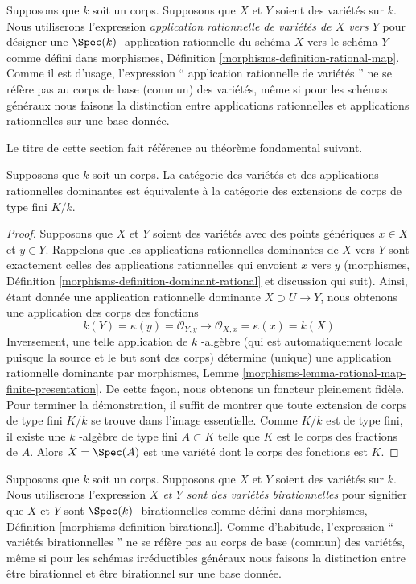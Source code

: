 \noindent
Supposons que $k$ soit un corps. Supposons que $X$ et $Y$ soient des variétés
sur $k$. Nous utiliserons l'expression {\it application rationnelle de
variétés de $X$ vers $Y$ } pour désigner une $\Spec(k)$ -application
rationnelle du schéma $X$ vers le schéma $Y$ comme défini dans morphismes,
Définition \ref{morphisms-definition-rational-map}. Comme il est d'usage,
l'expression `` application rationnelle de variétés '' ne se réfère pas au corps de
base (commun) des variétés, même si pour les schémas généraux nous faisons la
distinction entre applications rationnelles et applications rationnelles sur une base donnée.

\medskip\noindent
Le titre de cette section fait référence au théorème fondamental suivant.

\begin{theorem}
\label{theorem-varieties-rational-maps}
Supposons que $k$ soit un corps. La catégorie des variétés
et des applications rationnelles dominantes est équivalente
à la catégorie des extensions de corps de type fini $K/k$.
\end{theorem}

\begin{proof}
Supposons que $X$ et $Y$ soient des variétés avec des points
génériques $x \in X$ et $y \in Y$. Rappelons que les applications
rationnelles dominantes de $X$ vers $Y$ sont exactement celles des
applications rationnelles qui envoient $x$ vers $y$ (morphismes,
Définition \ref{morphisms-definition-dominant-rational} et discussion
qui suit). Ainsi, étant donnée une application rationnelle dominante $X
\supset U \to Y$, nous obtenons une application des corps des fonctions
$$
k(Y) = \kappa(y) = \mathcal{O}_{Y, y}
\longrightarrow
\mathcal{O}_{X, x} = \kappa(x) = k(X)
$$
Inversement, une telle application de $k$ -algèbre (qui est
automatiquement locale puisque la source et le but sont des corps)
détermine (unique) une application rationnelle dominante par morphismes,
Lemme \ref{morphisms-lemma-rational-map-finite-presentation}. De cette façon,
nous obtenons un foncteur pleinement fidèle. Pour terminer la démonstration,
il suffit de montrer que toute extension de corps de type fini $K/k$ se trouve
dans l'image essentielle. Comme $K/k$ est de type fini, il existe une $k$
-algèbre de type fini $A \subset K$ telle que $K$ est le corps des fractions de
$A$. Alors $X = \Spec(A)$ est une variété dont le corps des fonctions est $K$.
\end{proof}

\noindent
Supposons que $k$ soit un corps. Supposons que $X$ et $Y$ soient des
variétés sur $k$. Nous utiliserons l'expression {\it $X$ et $Y$ sont
des variétés birationnelles } pour signifier que $X$ et $Y$ sont
$\Spec(k)$ -birationnelles comme défini dans morphismes, Définition
\ref{morphisms-definition-birational}. Comme d'habitude, l'expression ``
variétés birationnelles '' ne se réfère pas au corps de base (commun) des
variétés, même si pour les schémas irréductibles généraux nous faisons la
distinction entre être birationnel et être birationnel sur une base donnée.


